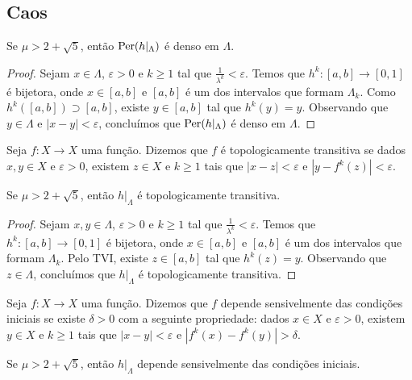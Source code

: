 \subsection{Caos}

\begin{proposition}
Se $\mu > 2 + \sqrt{5}$, então $\operatorname{Per}(h|_\Lambda)$ é denso em $\Lambda$.
\end{proposition}

\begin{proof}
Sejam $x \in \Lambda$, $\varepsilon > 0$ e $k \geq 1$ tal que $\frac{1}{\lambda^k} < \varepsilon$.
Temos que $h^k: [a, b] \to [0, 1]$ é bijetora, onde $x \in [a, b]$ e $[a, b]$ é um dos intervalos que formam $\Lambda_k$.
Como $h^k([a, b]) \supset [a, b]$, existe $y \in [a, b]$ tal que $h^k(y) = y$. Observando que $y \in \Lambda$ e $|x - y| < \varepsilon$, concluímos que $\operatorname{Per}(h|_\Lambda)$ é denso em $\Lambda$.
\end{proof}

\begin{definition}
Seja $f: X \to X$ uma função. Dizemos que $f$ é topologicamente transitiva se dados $x, y \in X$ e $\varepsilon > 0$,  existem $z \in X$ e $k \geq 1$ tais que $|x - z| < \varepsilon$ e $|y - f^k(z)| < \varepsilon$.
\end{definition} 

\begin{proposition}
Se $\mu > 2 + \sqrt{5}$, então $h|_\Lambda$ é topologicamente transitiva.
\end{proposition}

\begin{proof}
Sejam $x, y \in \Lambda$, $\varepsilon > 0$ e $k \geq 1$ tal que $\frac{1}{\lambda^k} < \varepsilon$.
Temos que $h^k: [a, b] \to [0, 1]$ é bijetora, onde $x \in [a, b]$ e $[a, b]$ é um dos intervalos que formam $\Lambda_k$. Pelo TVI, existe $z \in [a, b]$ tal que $h^k(z) = y$. Observando que $z \in \Lambda$, concluímos que $h|_\Lambda$ é topologicamente transitiva.
\end{proof}

\begin{definition}
Seja $f: X \to X$ uma função. Dizemos que $f$ depende sensivelmente das condições iniciais se existe $\delta > 0$ com a seguinte propriedade: dados $x \in X$ e $\varepsilon > 0$, existem $y \in X$ e $k \geq 1$ tais que $|x - y| < \varepsilon$ e $|f^k(x) - f^k(y)| > \delta$.
\end{definition}

\begin{proposition}
Se $\mu > 2 + \sqrt{5}$, então $h|_\Lambda$ depende sensivelmente das condições iniciais.
\end{proposition}

